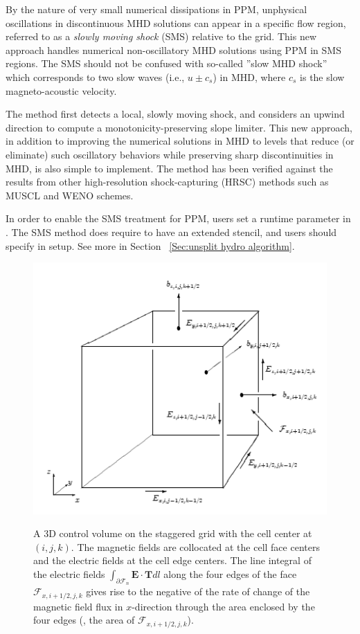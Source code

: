 By the nature of very small numerical dissipations in PPM, unphysical
oscillations in discontinuous MHD solutions can appear 
in a specific flow region, referred to as a {\it {slowly moving shock}} (SMS)
relative to the grid. This new approach handles numerical non-oscillatory MHD solutions using
PPM in SMS regions.
The SMS should not be confused with so-called ''slow MHD shock'' which
corresponds to two slow waves (i.e., $u \pm c_s$) in MHD,
where $c_s$ is the slow magneto-acoustic velocity. 

The method first detects a local, slowly moving shock, and considers
an upwind direction to compute a monotonicity-preserving slope limiter.
This new approach, in addition to improving the numerical solutions in
MHD to levels that reduce (or eliminate) such oscillatory behaviors
while preserving sharp discontinuities in MHD, is also simple to
implement. The method has been verified against the results from other high-resolution
shock-capturing (HRSC) methods such as MUSCL and WENO schemes.

In order to enable the SMS treatment for PPM, 
users set a runtime parameter  in .
The SMS method does require to have an extended stencil, and users should
specify  in setup. See more in
Section ~\ref{Sec:unsplit hydro algorithm}.

\begin{figure}
\begin{center}
{\leavevmode\includegraphics[width=5in]{MHD_GridStaggeredMesh}}
\end{center}
\caption{\label{Fig:GridStaggeredControlVolume3D} A 3D control volume
on the staggered grid with the cell center at $(i,j,k)$. The magnetic
fields are collocated at the cell face centers and the electric fields
at the cell edge centers. The line integral of the electric fields
$\int_{{\partial \mathcal{F}_n}} \mathbf{E}\cdot\mathbf{T}dl$ along
the four edges of the face $\mathcal{F}_{x,i+1/2,j,k}$ gives rise
to the negative of the rate of change of the magnetic field flux
in $x$-direction through the area enclosed by the four edges
(\ie, the area of $\mathcal{F}_{x,i+1/2,j,k}$).}
\end{figure}


